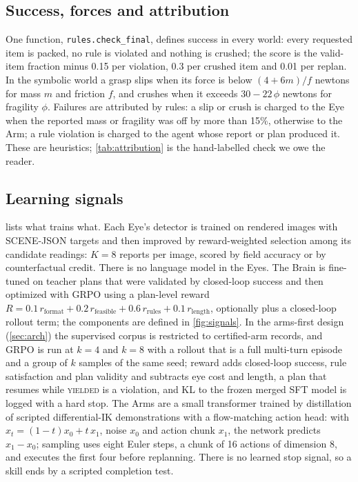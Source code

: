 \subsection{Success, forces and attribution}\label{sec:success}
One function, \texttt{rules.check\_final}, defines success in every world: every requested item is packed, no rule is violated and nothing is crushed; the score is the valid-item fraction minus 0.15 per violation, 0.3 per crushed item and 0.01 per replan.
In the symbolic world a grasp slips when its force is below $(4+6m)/f$ newtons for mass $m$ and friction $f$, and crushes when it exceeds $30-22\,\phi$ newtons for fragility $\phi$.
Failures are attributed by rules: a slip or crush is charged to the Eye when the reported mass or fragility was off by more than 15\%, otherwise to the Arm; a rule violation is charged to the agent whose report or plan produced it.
These are heuristics; \cref{tab:attribution} is the hand-labelled check we owe the reader.

\subsection{Learning signals}\label{sec:signals}
 lists what trains what.
Each Eye's detector is trained on rendered images with SCENE-JSON targets and then improved by reward-weighted selection among its candidate readings: $K=8$ reports per image, scored by field accuracy or by counterfactual credit. There is no language model in the Eyes. 
The Brain is fine-tuned on teacher plans that were validated by closed-loop success and then optimized with GRPO using a plan-level reward $R = 0.1\,r_{\text{format}} + 0.2\,r_{\text{feasible}} + 0.6\,r_{\text{rules}} + 0.1\,r_{\text{length}}$, optionally plus a closed-loop rollout term; the components are defined in \cref{fig:signals}.
In the arms-first design (\cref{sec:arch}) the supervised corpus is restricted to certified-arm records, and GRPO is run at $k=4$ and $k=8$ with a rollout that is a full multi-turn episode and a group of $k$ samples of the same seed; reward adds closed-loop success, rule satisfaction and plan validity and subtracts eye cost and length, a plan that resumes while \textsc{yielded} is a violation, and KL to the frozen merged SFT model is logged with a hard stop.
The Arms are a small transformer trained by distillation of scripted differential-IK demonstrations with a flow-matching action head: with $x_t=(1-t)x_0+t\,x_1$, noise $x_0$ and action chunk $x_1$, the network predicts $x_1-x_0$; sampling uses eight Euler steps, a chunk of 16 actions of dimension 8, and executes the first four before replanning.
There is no learned stop signal, so a skill ends by a scripted completion test.

